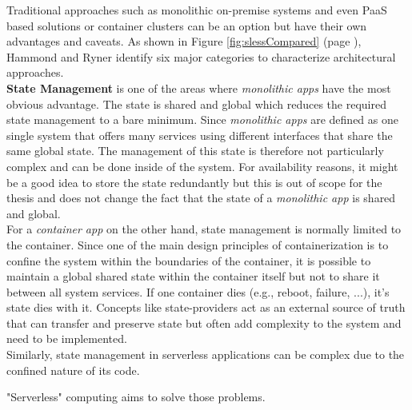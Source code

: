 Traditional approaches such as monolithic on-premise systems and even \acf{PaaS} based solutions or container clusters can be an option but have their own advantages and caveats. As shown in Figure \ref{fig:slessCompared}
(page \pageref{fig:slessCompared}), Hammond and Ryner identify six major categories to characterize architectural approaches.\\
\textbf{State Management} is one of the areas where \textit{monolithic apps} have the most obvious advantage. The state is shared and global which reduces the required state management to a bare minimum. Since \textit{monolithic apps} are defined as one single system that offers many services using different interfaces that share the same global state. \autocite{Villamizar2015EvaluatingCloud} The management of this state is therefore not particularly complex and can be done inside of the system. For availability reasons, it might be a good idea to store the state redundantly but this is out of scope for the thesis and does not change the fact that the state of a \textit{monolithic app} is shared and global.\\
For a \textit{container app} on the other hand, state management is normally limited to the container. Since one of the main design principles of containerization is to confine the system within the boundaries of the container, it is possible to maintain a global shared state within the container itself but not to share it between all system services. If one container dies (e.g., reboot, failure, ...), it's state dies with it. Concepts like state-providers act as an external source of truth that can transfer and preserve state but often add complexity to the system and need to be implemented.\autocite{Ling2004SessionState}\\
Similarly, state management in serverless applications can be complex due to the confined nature of its code. 

"Serverless" computing aims to solve those problems.\autocite{Roberts2016ServerlessArchitectures}